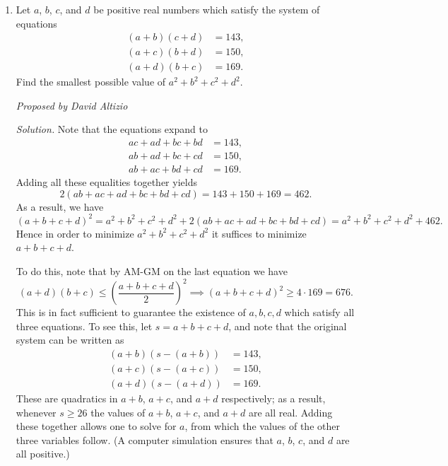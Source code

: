 \documentclass[10pt]{article}
\newcommand{\proposed}[1]
{
\vspace{5pt}
\noindent\textit{Proposed by #1}
}
\newcommand{\solution}
{
\vspace{5pt}
\noindent\textit{Solution.}\qquad
}
\begin{document}
\begin{enumerate}
\solution In general, let $|\omega| = n$. Note that $\omega, \omega^{2}, \lambda
\omega$ form an equilateral triangle if and only if $1, \lambda, \omega$ for an
equilateral triangle in the complex plane. This is because multiplying each
number by $\omega$ scales and rotates every point in the plane by the same
amount. Interpreting the complex numbers $1, \omega$ as vectors, it follows that
$\lambda$ exists only if the angle between $1, \omega$ is $\frac{\pi}{3}$. Also
note that $| \omega - 1 | = |\lambda - 1|  = \lambda - 1$ since
$\lambda, 1$ are other vertices of the same equilateral triangle. By
the Law of Cosines, we have 
\begin{align*}
    |w|^{2} &= 1 + |\omega - 1|^{2} + |\omega-1| \\
    &= 1 + (\lambda -1)^{2} + (\lambda - 1),
\end{align*}
and so $\lambda = \frac{1 + \sqrt{4n^{2} - 3}}{2}.$ It follows that $a + b + c =
4n^{2},$ and so the desired answer is simply $\sqrt{4032^{2}} = \boxed{4032}.$

\item Let $a$, $b$, $c$, and $d$ be positive real numbers which satisfy the system of equations \begin{align*}(a+b)(c+d)&=143,\\(a+c)(b+d)&=150,\\(a+d)(b+c)&=169.\end{align*} Find the smallest possible value of $a^2+b^2+c^2+d^2$.

\proposed{David Altizio}

\solution Note that the equations expand to \begin{align*}ac+ad+bc+bd&=143,\\ab+ad+bc+cd&=150,\\ab+ac+bd+cd&=169.\end{align*} Adding all these equalities together yields \[2(ab+ac+ad+bc+bd+cd)=143+150+169=462.\] As a result, we have \[(a+b+c+d)^2=a^2+b^2+c^2+d^2+2(ab+ac+ad+bc+bd+cd)=a^2+b^2+c^2+d^2+462.\] Hence in order to minimize $a^2+b^2+c^2+d^2$ it suffices to minimize $a+b+c+d$.

\par To do this, note that by AM-GM on the last equation we have \[(a+d)(b+c)\leq\left(\dfrac{a+b+c+d}2\right)^2\implies (a+b+c+d)^2\geq 4\cdot 169=676.\] This is in fact sufficient to guarantee the existence of $a,b,c,d$ which satisfy all three equations.  To see this, let $s=a+b+c+d$, and note that the original system can be written as \begin{align*}(a+b)(s-(a+b))&=143,\\(a+c)(s-(a+c))&=150,\\(a+d)(s-(a+d))&=169.\end{align*} These are quadratics in $a+b$, $a+c$, and $a+d$ respectively; as a result, whenever $s\geq 26$ the values of $a+b$, $a+c$, and $a+d$ are all real.  Adding these together allows one to solve for $a$, from which the values of the other three variables follow.  (A computer simulation ensures that $a$, $b$, $c$, and $d$ are all positive.)


\end{enumerate}
\end{document}
